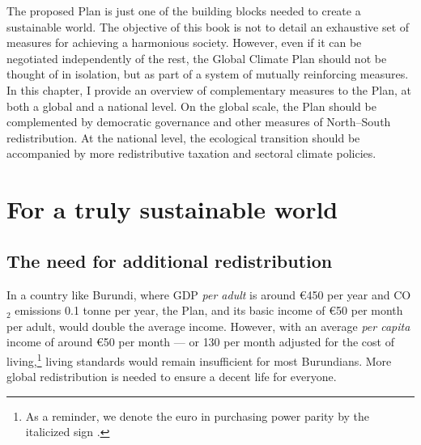 \documentclass[a5paper,english,openany]{memoir}
\begin{document}
The proposed Plan %
is just one of the building blocks needed to create a sustainable world. The objective of this book is not %
to detail an exhaustive set of measures for achieving a harmonious society. However, even if it can be negotiated independently of the rest, the Global Climate Plan should not be thought of in isolation, but as part of a system of mutually reinforcing measures. In this chapter, I %
provide an overview of complementary measures to the %
Plan, at both %
a global and %
a national level. On the %
global scale, the Plan should be complemented by democratic governance and other measures of North--South redistribution. At the %
national level, the ecological transition %
should be accompanied by more redistributive taxation and sectoral climate policies. 

\section*{For a truly sustainable world}

\subsection*{The need for additional redistribution}
In a country like Burundi, where GDP \textit{per adult} is around \euro{}450 per year and CO$_\text{2}$ emissions 0.1 tonne per year, the %
Plan, %
and its basic income of \euro{}50 per month per adult, %
would double the average income. 
However, with an average \textit{per capita} income of around \euro{}50 per month --- or \textit{\texteuro{}}130 per month adjusted for the cost of living,\footnote{As a reminder, we denote the euro in purchasing power parity by the italicized %
sign \textit{\texteuro{}}.} 
living standards would remain insufficient for most Burundians. More global redistribution is needed to ensure a decent life for everyone. 
\end{document}

